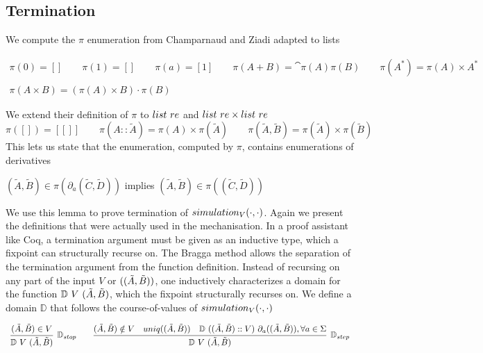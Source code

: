 \documentclass[a4paper,UKenglish,cleveref, autoref, thm-restate]{lipics-v2021}
\newcommand\mycomment[1]{}
\begin{document}
\subsection{Termination}
\mycomment{actually the code only uses the partial one, goes directly from language containment I think}
We compute the $\pi$ enumeration from Champarnaud and Ziadi \cite{CZ01} adapted to lists
\begin{definition}[Enumeration]
  \begin{displaymath}
    \begin{array}{lll}
  \pi(0) = [] \qquad \pi(1) = [] \qquad \pi(a) = [1] \qquad \pi(A + B) = \cat{\pi(A)}{\pi(B)} \qquad \pi(A^*) =\pi(A) \times A^*  \\\\
  \pi(A \times B) = (\pi(A) \times B) \cdot \pi(B)  
    \end{array}
  \end{displaymath}

\end{definition}
We extend their definition of $\pi$ to $\mathsf{list}~\re$ and $\mathsf{list}~\re \times \mathsf{list}~\re$
\[\pi([])=[[]] \qquad \pi(A::\tilde{A}) = \pi(A) \times \pi(\tilde{A}) \qquad \pi(\tilde{A},\tilde{B})= \pi(\tilde{A}) \times \pi(\tilde{B})\]
This lets us state that the enumeration, computed by $\pi$, contains enumerations of derivatives 
\begin{lemma}\label{lem:closure}
 $(\tilde{A},\tilde{B}) \in \pi(\partial_a(\tilde{C},\tilde{D}))$ implies  $(\tilde{A},\tilde{B}) \in \pi((\tilde{C},\tilde{D}))$ 
\end{lemma}
We use this lemma to prove termination of $\simulationb{V}{\cdot}{\cdot}$. Again we present the definitions that were actually used in the mechanisation. In a proof assistant like Coq, a termination argument must be given as an inductive type, which a fixpoint can structurally recurse on. The Bragga method \cite{WMF21} allows the separation of the termination argument from the function definition. Instead of recursing on any part of the input $V$ or $((\tilde{A},\tilde{B}))$, one inductively characterizes a domain for the function $\mathbb{D}~V~(\tilde{A},\tilde{B})$, which the fixpoint structurally recurses on. We define a domain $\mathbb{D}$ that follows the course-of-values of $\simulationb{V}{\cdot}{\cdot}$
\begin{definition}[Domain]
  \begin{displaymath}
    \begin{array}{lll}
      \infer[\mathbb{D}_{stop}]{\domm{V}{\pder{A}{B}}}{\pder{A}{B} \in V} \qquad \infer[\mathbb{D}_{step}]{\domm{V}{\pder{A}{B}}}{\pder{A}{B} \notin V & \mathsf{uniq}(\pder{A}{B}) & \domm{(\pder{A}{B}::V)}{\partial_a(\pder{A}{B})},\forall a \in \Sigma}
    \end{array}
  \end{displaymath}
\end{definition}
\end{document}
